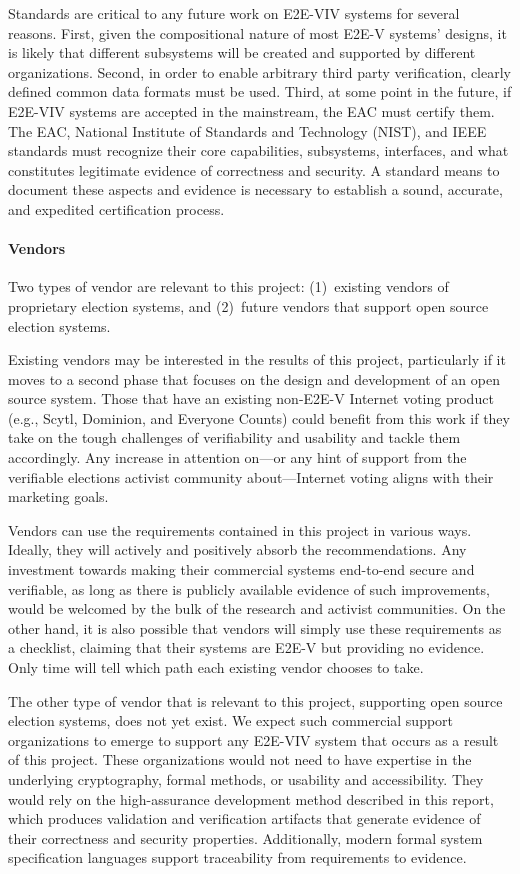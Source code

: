 Standards are critical to any future work on E2E-VIV systems for
several reasons. First, given the compositional nature of most E2E-V
systems’ designs, it is likely that different subsystems will be
created and supported by different organizations. Second, in order to
enable arbitrary third party verification, clearly defined common data
formats must be used. Third, at some point in the future, if E2E-VIV
systems are accepted in the mainstream, the EAC must certify them. The
EAC, National Institute of Standards and Technology (NIST), and IEEE
standards must recognize their core capabilities, subsystems,
interfaces, and what constitutes legitimate evidence of correctness
and security. A standard means to document these aspects and evidence
is necessary to establish a sound, accurate, and expedited
certification process.

\paragraph{Vendors}
Two types of vendor are relevant to this project: (1)~existing vendors
of proprietary election systems, and (2)~future vendors that support
open source election systems.

Existing vendors may be interested in the results of this project,
particularly if it moves to a second phase that focuses on the design
and development of an open source system. Those that have an existing
non-E2E-V Internet voting product (e.g., Scytl, Dominion, and Everyone
Counts) could benefit from this work if they take on the tough
challenges of verifiability and usability and tackle them
accordingly. Any increase in attention on—or any hint of support from
the verifiable elections activist community about—Internet voting
aligns with their marketing goals.

Vendors can use the requirements contained in this project in various
ways. Ideally, they will actively and positively absorb the
recommendations. Any investment towards making their commercial
systems end-to-end secure and verifiable, as long as there is publicly
available evidence of such improvements, would be welcomed by the bulk
of the research and activist communities. On the other hand, it is
also possible that vendors will simply use these requirements as a
checklist, claiming that their systems are E2E-V but providing no
evidence. Only time will tell which path each existing vendor chooses
to take.
 
The other type of vendor that is relevant to this project, supporting
open source election systems, does not yet exist. We expect such
commercial support organizations to emerge to support any E2E-VIV
system that occurs as a result of this project. These organizations
would not need to have expertise in the underlying cryptography,
formal methods, or usability and accessibility. They would rely on the
high-assurance development method described in this report, which
produces validation and verification artifacts that generate evidence
of their correctness and security properties. Additionally, modern
formal system specification languages support traceability from
requirements to evidence.

